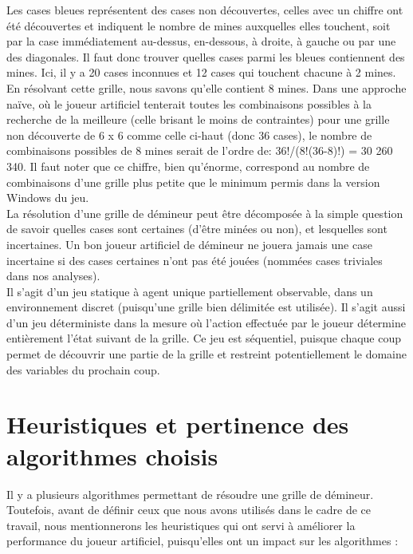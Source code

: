 \documentclass{article}
\begin{document}
Les cases bleues représentent des cases non découvertes, celles avec un chiffre ont 
été découvertes et indiquent le nombre de mines auxquelles elles touchent, soit par 
la case immédiatement au-dessus, en-dessous, à droite, à gauche ou par une des diagonales. 
Il faut donc trouver quelles cases parmi les bleues contiennent des mines. Ici, il y a 
20 cases inconnues et 12 cases qui touchent chacune à 2 mines. En résolvant cette grille, 
nous savons qu’elle contient 8 mines. Dans une approche naïve, où le joueur artificiel 
tenterait toutes les combinaisons possibles à la recherche de la meilleure 
(celle brisant le moins de contraintes) pour une grille non découverte de 6 x 6 
comme celle ci-haut (donc 36 cases), le nombre de combinaisons possibles de 8 mines serait de l’ordre de:
36!/(8!(36-8)!) = 30 260 340. 
Il faut noter que ce chiffre, bien qu’énorme, correspond au nombre de combinaisons d’une grille 
plus petite que le minimum permis dans la version Windows du jeu. \\

La résolution d’une grille de démineur peut être décomposée à la simple question de savoir quelles 
cases sont certaines (d’être minées ou non), et lesquelles sont incertaines. Un bon joueur 
artificiel de démineur ne jouera jamais une case incertaine si des cases certaines 
n’ont pas été jouées (nommées cases triviales dans nos analyses). \\

Il s’agit d’un jeu statique à agent unique partiellement observable, dans un environnement 
discret (puisqu’une grille bien délimitée est utilisée). Il s’agit aussi d’un jeu 
déterministe dans la mesure où l’action effectuée par le joueur détermine entièrement 
l’état suivant de la grille. Ce jeu est séquentiel, puisque chaque coup permet de 
découvrir une partie de la grille et restreint potentiellement le domaine des variables du prochain coup.

\section{Heuristiques et pertinence des algorithmes choisis}

Il y a plusieurs algorithmes permettant de résoudre une grille de démineur. 
Toutefois, avant de définir ceux que nous avons utilisés dans le cadre de ce travail, 
nous mentionnerons les heuristiques qui ont servi à améliorer la performance du joueur 
artificiel, puisqu’elles ont un impact sur les algorithmes :
\end{document}
